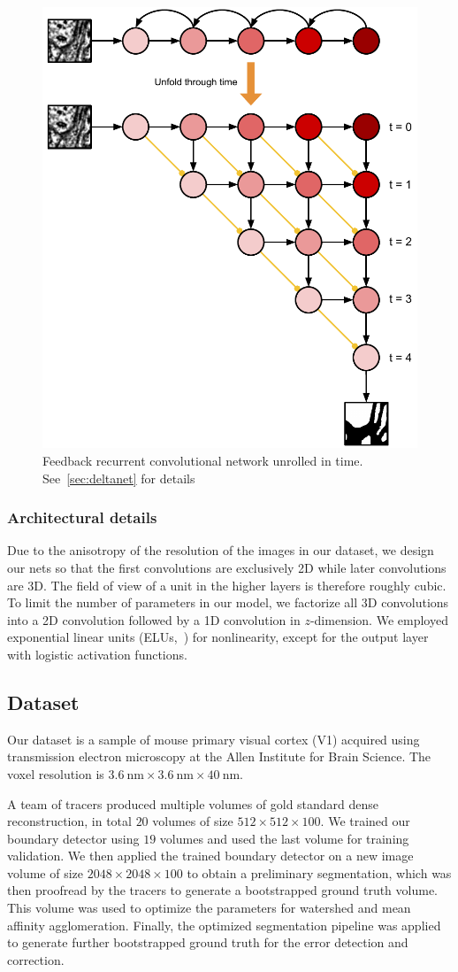\documentclass{article}
\begin{document}
\begin{appendices}
\begin{figure}[!t]
\centering
\includegraphics[width=0.65\linewidth]{unfold.pdf}

\caption{Feedback recurrent convolutional network unrolled in time.
See~\ref{sec:deltanet} for details}

\label{fig:unfold}
\end{figure}

\subsubsection{Architectural details} Due to the anisotropy of the resolution of
the images in our dataset, we design our nets so that the first convolutions are
exclusively 2D while later convolutions are 3D. The field of view of a unit in
the higher layers is therefore roughly cubic. To limit the number of parameters
in our model, we factorize all 3D convolutions into a 2D convolution followed by
a 1D convolution in $z$-dimension. We employed exponential linear units
(ELUs,~\cite{elu}) for nonlinearity, except for the output layer with logistic
activation functions.

\subsection{Dataset}
Our dataset is a sample of mouse primary visual cortex (V1) acquired using
transmission electron microscopy at the Allen Institute for Brain Science. The
voxel resolution is $3.6~\text{nm} \times 3.6~\text{nm} \times 40~\text{nm}$.

A team of tracers produced multiple volumes of gold standard dense reconstruction, in total $20$ volumes of size $512 \times 512 \times 100$. We trained our boundary detector using $19$ volumes and used the last volume for training validation. We then applied the trained boundary detector on a new image volume of size $2048 \times 2048 \times 100$ to obtain a preliminary segmentation, which was then proofread by the tracers to generate a bootstrapped ground truth volume. This volume was used to optimize the parameters for watershed and mean affinity agglomeration. Finally, the optimized segmentation pipeline was applied to generate further bootstrapped ground truth for the error detection and correction.


\end{appendices}
\end{document}
